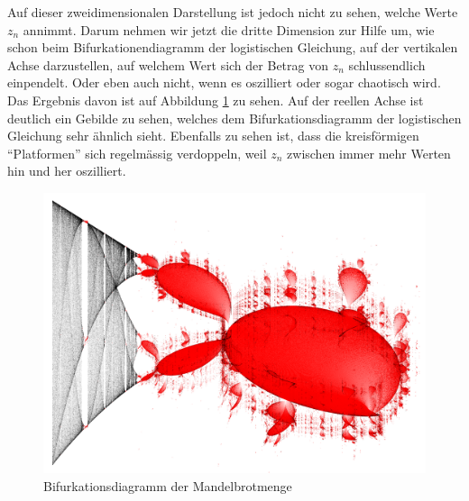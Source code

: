 Auf dieser zweidimensionalen Darstellung ist jedoch nicht zu sehen, 
welche Werte $z_n$ annimmt.
Darum nehmen wir jetzt die dritte Dimension zur Hilfe um,
wie schon beim Bifurkationendiagramm der logistischen Gleichung,
auf der vertikalen Achse darzustellen, 
auf welchem Wert sich der Betrag von $z_n$ schlussendlich einpendelt.
Oder eben auch nicht, wenn es oszilliert oder sogar
chaotisch wird. 
Das Ergebnis davon ist auf Abbildung 
\ref{fig:mandel_3d}
zu sehen. 
Auf der reellen Achse ist deutlich ein Gebilde zu sehen,
welches dem Bifurkationsdiagramm der logistischen
Gleichung sehr ähnlich sieht. 
Ebenfalls zu sehen ist, dass die kreisförmigen
``Platformen'' sich regelmässig verdoppeln, weil
$z_n$ zwischen immer mehr Werten hin und her oszilliert.
\begin{figure}
    \includegraphics[width=\linewidth]{papers/logistic/figures/mandel_3d.png}
    \caption{Bifurkationsdiagramm der Mandelbrotmenge}
    \label{fig:mandel_3d}
\end{figure}
